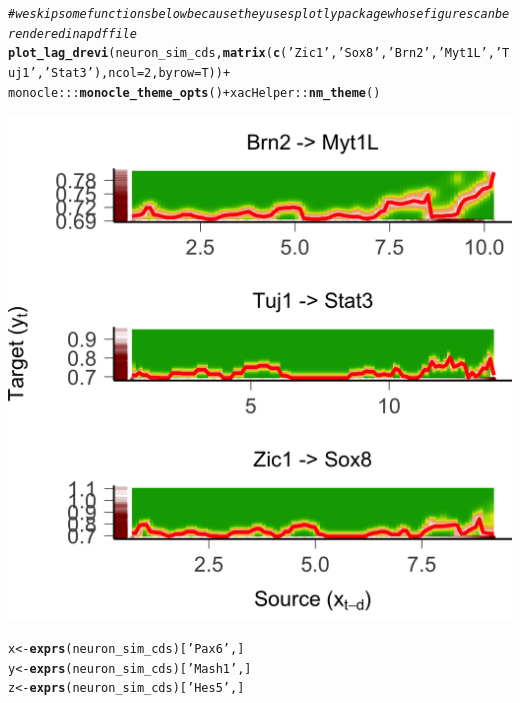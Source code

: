 \documentclass[10pt,oneside]{article}\usepackage[]{graphicx}\usepackage[]{color}
\makeatletter
\def\maxwidth{ %
  \ifdim\Gin@nat@width>\linewidth
    \linewidth
  \else
    \Gin@nat@width
  \fi
}
\newcommand{\hlnum}[1]{\textcolor[rgb]{0.686,0.059,0.569}{#1}}%
\newcommand{\hlstr}[1]{\textcolor[rgb]{0.192,0.494,0.8}{#1}}%
\newcommand{\hlcom}[1]{\textcolor[rgb]{0.678,0.584,0.686}{\textit{#1}}}%
\newcommand{\hlopt}[1]{\textcolor[rgb]{0,0,0}{#1}}%
\newcommand{\hlstd}[1]{\textcolor[rgb]{0.345,0.345,0.345}{#1}}%
\newcommand{\hlkwb}[1]{\textcolor[rgb]{0.69,0.353,0.396}{#1}}%
\newcommand{\hlkwc}[1]{\textcolor[rgb]{0.333,0.667,0.333}{#1}}%
\newcommand{\hlkwd}[1]{\textcolor[rgb]{0.737,0.353,0.396}{\textbf{#1}}}%
\newenvironment{kframe}{%
 \def\at@end@of@kframe{}%
 \ifinner\ifhmode%
  \def\at@end@of@kframe{\end{minipage}}%
  \begin{minipage}{\columnwidth}%
 \fi\fi%
 \def\FrameCommand##1{\hskip\@totalleftmargin \hskip-\fboxsep
 \colorbox{shadecolor}{##1}\hskip-\fboxsep
     \hskip-\linewidth \hskip-\@totalleftmargin \hskip\columnwidth}%
 \MakeFramed {\advance\hsize-\width
   \@totalleftmargin\z@ \linewidth\hsize
   \@setminipage}}%
 {\par\unskip\endMakeFramed%
 \at@end@of@kframe}
\newenvironment{knitrout}{}{} %
\makeatother
\begin{document}
\begin{knitrout}
\color{fgcolor}\begin{kframe}
\begin{alltt}
\hlcom{# we skip some functions below because they uses plotly package whose figures can be rendered in a pdf file }
\hlkwd{plot_lag_drevi}\hlstd{(neuron_sim_cds,} \hlkwd{matrix}\hlstd{(}\hlkwd{c}\hlstd{(}\hlstr{'Zic1'}\hlstd{,} \hlstr{'Sox8'}\hlstd{,} \hlstr{'Brn2'}\hlstd{,} \hlstr{'Myt1L'}\hlstd{,} \hlstr{'Tuj1'}\hlstd{,} \hlstr{'Stat3'}\hlstd{),} \hlkwc{ncol} \hlstd{=} \hlnum{2}\hlstd{,} \hlkwc{byrow} \hlstd{= T))} \hlopt{+}
  \hlstd{monocle}\hlopt{:::}\hlkwd{monocle_theme_opts}\hlstd{()} \hlopt{+} \hlstd{xacHelper}\hlopt{::}\hlkwd{nm_theme}\hlstd{()}
\end{alltt}
\end{kframe}

{\centering \includegraphics[width=\maxwidth]{figure/gene_pairwise_plot-1} 

}


\begin{kframe}\begin{alltt}
\hlstd{x} \hlkwb{<-} \hlkwd{exprs}\hlstd{(neuron_sim_cds)[}\hlstr{'Pax6'}\hlstd{, ]}
\hlstd{y} \hlkwb{<-} \hlkwd{exprs}\hlstd{(neuron_sim_cds)[}\hlstr{'Mash1'}\hlstd{, ]}
\hlstd{z} \hlkwb{<-} \hlkwd{exprs}\hlstd{(neuron_sim_cds)[}\hlstr{'Hes5'}\hlstd{, ]}


\end{alltt}
\end{kframe}
\end{knitrout}
\end{document}
